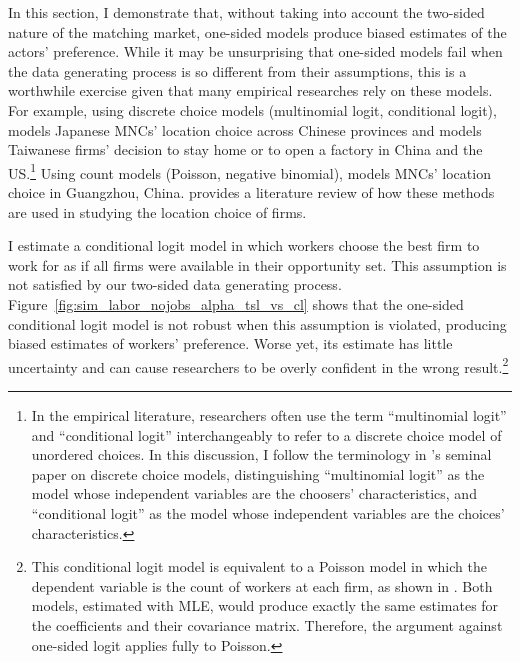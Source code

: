 In this section, I demonstrate that, without taking into account the two-sided
nature of the matching market, one-sided models produce biased estimates of the
actors' preference. While it may be unsurprising that one-sided models fail when
the data generating process is so different from their assumptions, this is a
worthwhile exercise given that many empirical researches rely on these models.
For example, using discrete choice models (multinomial logit, conditional
logit), \citet{Cheng2006} models Japanese MNCs' location
choice across Chinese provinces and \citet{Aw2008} models Taiwanese firms' decision to
stay home or to open a factory in China and the US.\footnote{In the empirical literature,
  researchers often use the term ``multinomial logit'' and ``conditional logit''
interchangeably to refer to a discrete choice model of unordered choices.
In this discussion, I follow the terminology in \citet{McFadden1974}'s seminal paper on discrete
choice models, distinguishing ``multinomial logit'' as the model whose
independent variables are the choosers' characteristics, and ``conditional
logit'' as the model whose independent variables are the choices' characteristics.} Using count models (Poisson, negative
binomial), \citet{Wu1999} models MNCs' location choice in Guangzhou, China.
\citet{Arauzo-Carod2010} provides a literature review of how these methods are used in
studying the location choice of firms.

I estimate a conditional logit model in which workers choose the best firm to work
for as if all firms were available in their opportunity set. This assumption is
not satisfied by our two-sided data generating process. Figure~\ref{fig:sim_labor_nojobs_alpha_tsl_vs_cl} shows that the one-sided
conditional logit model is not robust when this assumption is violated,
producing biased estimates of workers' preference. Worse yet, its estimate has
little uncertainty and can cause researchers to be overly confident in the wrong
result.\footnote{This conditional logit model is equivalent to a Poisson model
  in which the dependent variable is the count of workers at each firm, as shown in
\citet{Guimaraes2003}. Both models, estimated with MLE, would produce exactly
the same estimates for the coefficients and their covariance matrix.
Therefore, the argument against one-sided logit applies fully to Poisson.}

